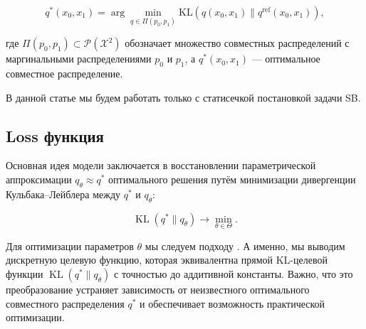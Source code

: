 \documentclass{article}
\newtheorem{proposition}[theorem]{Proposition}%
\begin{document}
\[
q^*(x_0, x_1) = \arg\min_{q \in \Pi(p_0, p_1)} \text{KL} \left( q(x_0, x_1) \| q^{\text{ref}}(x_0, x_1) \right), \tag{3}
\]

где \( \Pi(p_0, p_1) \subset \mathcal{P}(\mathcal{X}^2) \) обозначает множество совместных распределений с маргинальными распределениями \( p_0 \) и \( p_1 \), а \( q^*(x_0, x_1) \) — оптимальное совместное распределение.

В данной статье мы будем работать только с статисечкой постановкой задачи SB.

\subsection{Loss функция}

    Основная идея модели заключается в восстановлении параметрической аппроксимации \(q_{\theta} \approx q^*\) оптимального решения путём минимизации дивергенции Кульбака–Лейблера между \(q^*\) и \(q_{\theta}\):

\[
\operatorname{KL}(q^* \| q_{\theta}) \to \min_{\theta \in \Theta}. \tag{5}
\]

Для оптимизации параметров \( \theta \) мы следуем подходу \citep{korotin2024light}. А именно, мы выводим дискретную целевую функцию, которая эквивалентна прямой KL-целевой функции \( \operatorname{KL}(q^* \| q_\theta) \) с точностью до аддитивной константы. Важно, что это преобразование устраняет зависимость от неизвестного оптимального совместного распределения \( q^* \) и обеспечивает возможность практической оптимизации.






\end{document}
